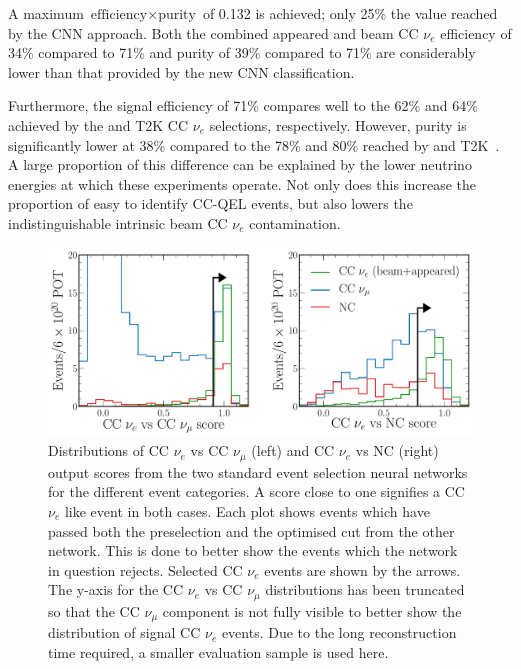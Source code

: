 A maximum $\text{efficiency}\times\text{purity}$ of 0.132 is achieved; only 25\% the value reached
by the CNN approach. Both the combined appeared and beam CC $\nu_{e}$ efficiency of 34\% compared
to 71\% and purity of 39\% compared to 71\% are considerably lower than that provided by the new
CNN classification.

Furthermore, the signal efficiency of 71\% compares well to the 62\% and 64\% achieved by the
\nova and T2K CC $\nu_{e}$ selections, respectively. However, purity is significantly lower at
38\% compared to the 78\% and 80\% reached by \nova and T2K~\cite{acero2019, abe2015}. A large
proportion of this difference can be explained by the lower neutrino energies at which these
experiments operate. Not only does this increase the proportion of easy to identify CC-QEL events,
but also lowers the indistinguishable intrinsic beam CC $\nu_{e}$ contamination.

\begin{figure} %
    \includegraphics[width=\textwidth]{diagrams/7-results/final_old_pid_outputs.pdf}
    \caption[Distributions of standard event selection neural network output scores]
    {Distributions of CC $\nu_{e}$ vs CC $\nu_{\mu}$ (left) and CC $\nu_{e}$ vs NC (right) output
        scores from the two standard event selection neural networks for the different event
        categories. A score close to one signifies a CC $\nu_{e}$ like event in both cases. Each
        plot shows events which have passed both the preselection and the optimised cut from the
        other network. This is done to better show the events which the network in question
        rejects. Selected CC $\nu_{e}$ events are shown by the arrows. The y-axis for the CC
        $\nu_{e}$ vs CC $\nu_{\mu}$ distributions has been truncated so that the CC $\nu_{\mu}$
        component is not fully visible to better show the distribution of signal CC $\nu_{e}$
        events. Due to the long reconstruction time required, a smaller evaluation sample is used
        here.}
    \label{fig:final_old_pid_outputs}
\end{figure}

